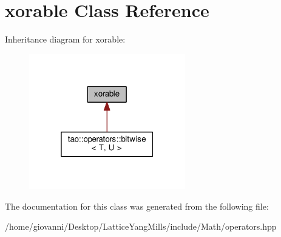 \hypertarget{classxorable}{}\section{xorable Class Reference}
\label{classxorable}


Inheritance diagram for xorable\+:\nopagebreak
\begin{figure}[H]
\begin{center}
\leavevmode
\includegraphics[width=193pt]{classxorable__inherit__graph}
\end{center}
\end{figure}


The documentation for this class was generated from the following file\+:\begin{DoxyCompactItemize}
\item 
/home/giovanni/\+Desktop/\+Lattice\+Yang\+Mills/include/\+Math/operators.\+hpp\end{DoxyCompactItemize}
